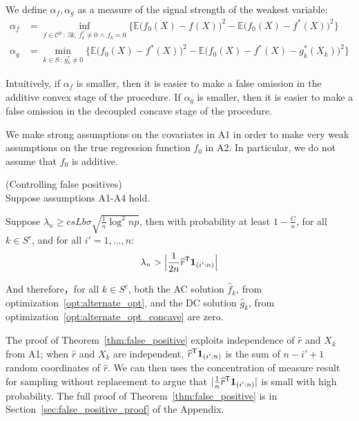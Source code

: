 We define $\alpha_f, \alpha_g$ as a measure of the signal strength of the weakest variable:
\begin{align*}
\alpha_f &= \inf_{f \in \mathcal{C}^p \,:\, \exists k ,\, f^*_k \neq 0 \,\wedge\, f_k = 0} 
       \Big\{ \mathbb{E} \big( f_0(X) - f(X) \big)^2 - 
        \mathbb{E} \big( f_0(X) - f^*(X) \big)^2  \Big\}\\
\alpha_g &=   \min_{k \in S \,:\, g^*_k \neq 0}
      \Big\{ \mathbb{E} \big( f_0(X) - f^*(X) \big)^2 - 
    \mathbb{E} \big( f_0(X) - f^*(X) - g^*_k(X_k) \big)^2 \Big\}
\end{align*}

Intuitively, if $\alpha_f$ is smaller, then it is easier to make a false omission in the additive convex stage of the procedure. If $\alpha_g$ is smaller, then it is easier to make a false omission in the decoupled concave stage of the procedure.

\begin{remark}
  We make strong assumptions on the covariates in A1 in order to make
  very weak assumptions on the true regression function $f_0$ in
  A2. In particular, we do not assume that $f_0$ is additive. 
\end{remark}


\begin{theorem} (Controlling false positives) \\
\label{thm:false_positive}
Suppose assumptions A1-A4 hold. 

Suppose $\lambda_n \geq c s Lb \sigma  \sqrt{ \frac{1}{n} \log^2 np}$, then with probability at least $ 1 - \frac{C}{n}$, for all $k \in S^c$, and for all $i'=1,...,n$:
\[
\lambda_n > \Big| \frac{1}{2n}\widehat{r}^{\mathsf{T}} \mbox{\boldmath $1$}_{(i':n)} \Big|
\]

And therefore，for all $k \in S^c$, both the AC solution $\hat{f}_k$, from optimization~\ref{opt:alternate_opt}, and the DC solution $\hat{g}_k$, from optimization~\ref{opt:alternate_opt_concave} are zero. \\
\end{theorem}

The proof of Theorem~\ref{thm:false_positive} exploits independence of
$\hat{r}$ and $X_k$ from A1; when $\hat{r}$ and $X_k$ are independent, $\widehat{r}^{\mathsf{T}} \mbox{\boldmath $1$}_{(i':n)}$ is the sum of $n - i' +1$ random coordinates of $\hat{r}$.  We can then uses the concentration of measure result for sampling without replacement to argue that $| \frac{1}{n} \widehat{r}^{\mathsf{T}}\mbox{\boldmath $1$}_{(i':n)}|$ is small with high probability. The full proof of
Theorem~\ref{thm:false_positive} is in
Section~\ref{sec:false_positive_proof} of the Appendix.

